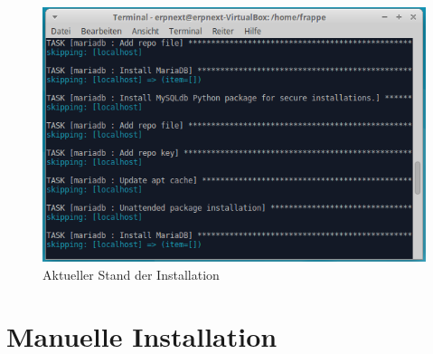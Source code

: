 \begin{figure}[H]
  \centering
  \includegraphics[width=\textwidth]{Bilder/Aktueller_Stand_Installation.PNG}
  \caption{Aktueller Stand der Installation}
  \label{fig:aktInst}
\end{figure}

\section{Manuelle Installation}

